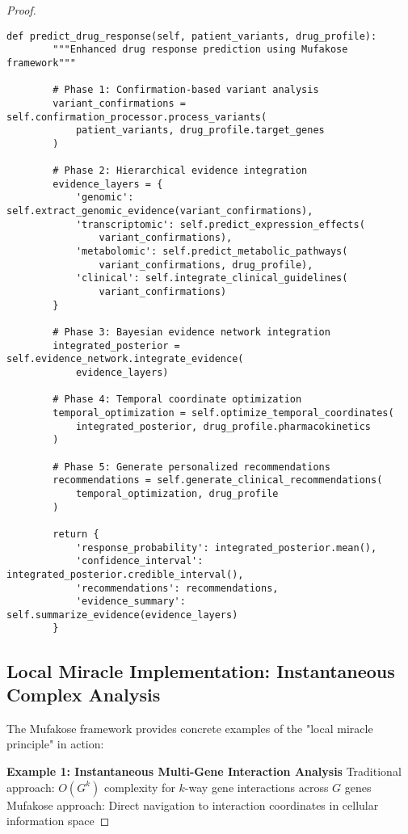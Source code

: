 \documentclass[12pt,a4paper]{article}
\begin{document}
\begin{proof}
\begin{lstlisting}[style=pythonstyle, caption=Mufakose-Enhanced Pharmacogenetic Analysis]
    def predict_drug_response(self, patient_variants, drug_profile):
        """Enhanced drug response prediction using Mufakose framework"""
        
        # Phase 1: Confirmation-based variant analysis
        variant_confirmations = self.confirmation_processor.process_variants(
            patient_variants, drug_profile.target_genes
        )
        
        # Phase 2: Hierarchical evidence integration
        evidence_layers = {
            'genomic': self.extract_genomic_evidence(variant_confirmations),
            'transcriptomic': self.predict_expression_effects(
                variant_confirmations),
            'metabolomic': self.predict_metabolic_pathways(
                variant_confirmations, drug_profile),
            'clinical': self.integrate_clinical_guidelines(
                variant_confirmations)
        }
        
        # Phase 3: Bayesian evidence network integration
        integrated_posterior = self.evidence_network.integrate_evidence(
            evidence_layers)
        
        # Phase 4: Temporal coordinate optimization
        temporal_optimization = self.optimize_temporal_coordinates(
            integrated_posterior, drug_profile.pharmacokinetics
        )
        
        # Phase 5: Generate personalized recommendations
        recommendations = self.generate_clinical_recommendations(
            temporal_optimization, drug_profile
        )
        
        return {
            'response_probability': integrated_posterior.mean(),
            'confidence_interval': integrated_posterior.credible_interval(),
            'recommendations': recommendations,
            'evidence_summary': self.summarize_evidence(evidence_layers)
        }
\end{lstlisting}

\subsection{Local Miracle Implementation: Instantaneous Complex Analysis}

The Mufakose framework provides concrete examples of the "local miracle principle" in action:

\textbf{Example 1: Instantaneous Multi-Gene Interaction Analysis}
Traditional approach: $O(G^k)$ complexity for $k$-way gene interactions across $G$ genes
Mufakose approach: Direct navigation to interaction coordinates in cellular information space


\end{proof}
\end{document}
